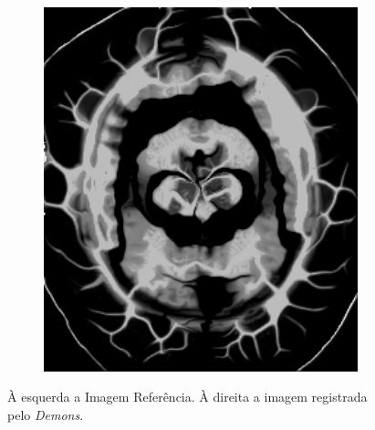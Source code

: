 \documentclass[t]{beamer}
\begin{document}
\begin{frame}
\begin{figure}[H]
\begin{subfigure}[b]{0.49\textwidth}
      \includegraphics[width=1\textwidth]{figuras/resultSinDistDemon.png}
    \end{subfigure}
    \caption{À esquerda a Imagem Referência. À direita a imagem registrada pelo \textit{Demons}.}
  \end{figure}
\end{frame}
\end{document}
